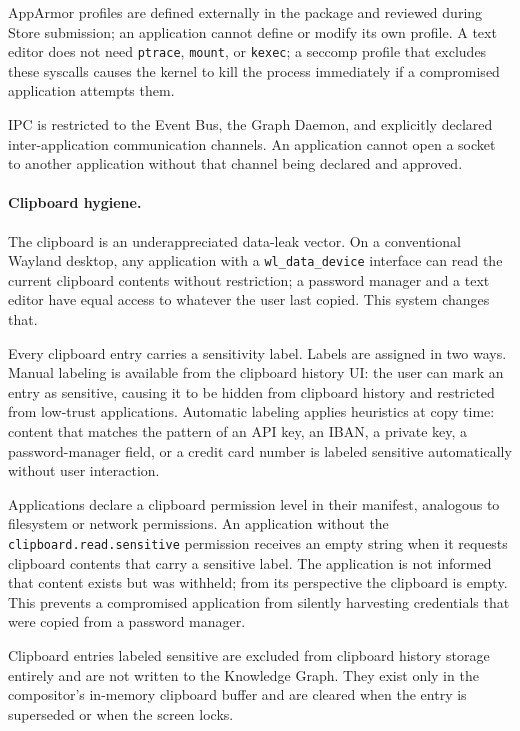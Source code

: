 AppArmor profiles are defined externally in the package and reviewed during
Store submission; an application cannot define or modify its own profile. A
text editor does not need \texttt{ptrace}, \texttt{mount}, or
\texttt{kexec}; a seccomp profile that excludes these syscalls causes the
kernel to kill the process immediately if a compromised application attempts
them.

IPC is restricted to the Event Bus, the Graph Daemon, and explicitly declared
inter-application communication channels. An application cannot open a socket
to another application without that channel being declared and approved.

\paragraph{Clipboard hygiene.}
The clipboard is an underappreciated data-leak vector. On a conventional
Wayland desktop, any application with a \texttt{wl\_data\_device} interface
can read the current clipboard contents without restriction; a password manager
and a text editor have equal access to whatever the user last copied. This
system changes that.

Every clipboard entry carries a sensitivity label. Labels are assigned in two
ways. Manual labeling is available from the clipboard history UI: the user can
mark an entry as sensitive, causing it to be hidden from clipboard history and
restricted from low-trust applications. Automatic labeling applies heuristics
at copy time: content that matches the pattern of an API key, an IBAN, a
private key, a password-manager field, or a credit card number is labeled
sensitive automatically without user interaction.

Applications declare a clipboard permission level in their manifest, analogous
to filesystem or network permissions. An application without the
\texttt{clipboard.read.sensitive} permission receives an empty string when it
requests clipboard contents that carry a sensitive label. The application is
not informed that content exists but was withheld; from its perspective the
clipboard is empty. This prevents a compromised application from silently
harvesting credentials that were copied from a password manager.

Clipboard entries labeled sensitive are excluded from clipboard history storage
entirely and are not written to the Knowledge Graph. They exist only in the
compositor's in-memory clipboard buffer and are cleared when the entry is
superseded or when the screen locks.

